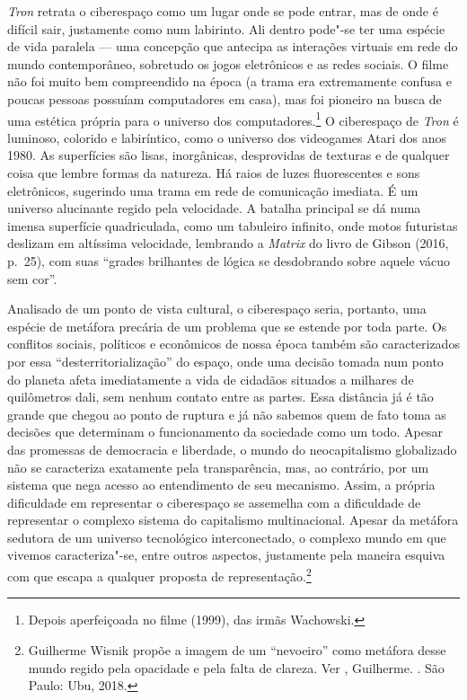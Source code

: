 \emph{Tron} retrata o ciberespaço como um lugar onde se pode entrar, mas
de onde é difícil sair, justamente como num labirinto. Ali dentro
pode"-se ter uma espécie de vida paralela --- uma concepção que antecipa
as interações virtuais em rede do mundo contemporâneo, sobretudo os
jogos eletrônicos e as redes sociais. O filme não foi muito bem
compreendido na época (a trama era extremamente confusa e poucas pessoas
possuíam computadores em casa), mas foi pioneiro na busca de uma
estética própria para o universo dos computadores.\footnote{Depois
  aperfeiçoada no filme {} (1999), das irmãs Wachowski.} O
ciberespaço de \emph{Tron} é luminoso, colorido e labiríntico, como o
universo dos videogames Atari dos anos 1980. As superfícies são lisas,
inorgânicas, desprovidas de texturas e de qualquer coisa que lembre
formas da natureza. Há raios de luzes fluorescentes e sons eletrônicos,
sugerindo uma trama em rede de comunicação imediata. É um universo
alucinante regido pela velocidade. A batalha principal se dá numa imensa
superfície quadriculada, como um tabuleiro infinito, onde motos
futuristas deslizam em altíssima velocidade, lembrando a \emph{Matrix} do livro de Gibson (2016, p.~25), com suas ``grades brilhantes de lógica se desdobrando sobre aquele vácuo sem cor''. 

Analisado de um ponto de vista cultural, o ciberespaço seria, portanto, uma
espécie de metáfora precária de um problema que se estende por toda
parte. Os conflitos sociais, políticos e econômicos de nossa época
também são caracterizados por essa ``desterritorialização'' do espaço,
onde uma decisão tomada num ponto do planeta afeta imediatamente a vida
de cidadãos situados a milhares de quilômetros dali, sem nenhum contato
entre as partes. Essa distância já é tão grande que chegou ao ponto de
ruptura e já não sabemos quem de fato toma as decisões que determinam o
funcionamento da sociedade como um todo. Apesar das promessas de
democracia e liberdade, o mundo do neocapitalismo globalizado não se
caracteriza exatamente pela transparência, mas, ao contrário, por um
sistema que nega acesso ao entendimento de seu mecanismo. Assim, a
própria dificuldade em representar o ciberespaço se assemelha com a
dificuldade de representar o complexo sistema do capitalismo
multinacional. Apesar da metáfora sedutora de um universo
tecnológico interconectado, o complexo mundo em que vivemos
caracteriza"-se, entre outros aspectos, justamente pela maneira esquiva
com que escapa a qualquer proposta de representação.\footnote{Guilherme
  Wisnik propõe a imagem de um ``nevoeiro'' como metáfora desse mundo
  regido pela opacidade e pela falta de clareza. Ver , Guilherme.
  {}. São
  Paulo: Ubu, 2018.}

